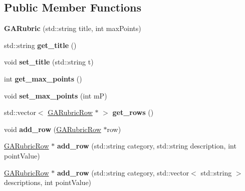 \subsection*{Public Member Functions}
\begin{DoxyCompactItemize}
\item 
\mbox{\label{class_g_a_rubric_a2a9233529a975bd8a26b7866f2d44cf1}} 
{\bfseries G\+A\+Rubric} (std\+::string title, int max\+Points)
\item 
\mbox{\label{class_g_a_rubric_a7d12ae44574c9db7fc48043321d02987}} 
std\+::string {\bfseries get\+\_\+title} ()
\item 
\mbox{\label{class_g_a_rubric_a9d6eb1655668d974c094a7a5c4e0d736}} 
void {\bfseries set\+\_\+title} (std\+::string t)
\item 
\mbox{\label{class_g_a_rubric_a1bc73cf6dbbd107c3396d12163efa2ab}} 
int {\bfseries get\+\_\+max\+\_\+points} ()
\item 
\mbox{\label{class_g_a_rubric_abcd98dc85cdbf4abe0d66503b9aaad06}} 
void {\bfseries set\+\_\+max\+\_\+points} (int mP)
\item 
\mbox{\label{class_g_a_rubric_a4b2d36c27c9d45501f8e6f11c1747cf5}} 
std\+::vector$<$ \hyperlink{class_g_a_rubric_row}{G\+A\+Rubric\+Row} $\ast$ $>$ {\bfseries get\+\_\+rows} ()
\item 
\mbox{\label{class_g_a_rubric_af039f5d2ff581616a1bdb5cd7c574a00}} 
void {\bfseries add\+\_\+row} (\hyperlink{class_g_a_rubric_row}{G\+A\+Rubric\+Row} $\ast$row)
\item 
\mbox{\label{class_g_a_rubric_aa09ea9945e571bca75f56484c3d11711}} 
\hyperlink{class_g_a_rubric_row}{G\+A\+Rubric\+Row} $\ast$ {\bfseries add\+\_\+row} (std\+::string category, std\+::string description, int point\+Value)
\item 
\mbox{\label{class_g_a_rubric_a6941a873945e03c666bd4de6fd12031e}} 
\hyperlink{class_g_a_rubric_row}{G\+A\+Rubric\+Row} $\ast$ {\bfseries add\+\_\+row} (std\+::string category, std\+::vector$<$ std\+::string $>$ descriptions, int point\+Value)

\end{DoxyCompactItemize}
